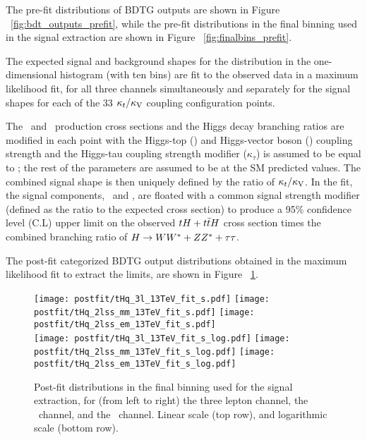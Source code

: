 The pre-fit distributions of BDTG outputs are shown in Figure ~\ref{fig:bdt_outputs_prefit}, while the pre-fit distributions in the final binning used in the signal extraction are shown in Figure ~\ref{fig:finalbins_prefit}.

The expected signal and background shapes for the distribution in the one-dimensional histogram (with ten bins) are fit to the observed data in a maximum likelihood fit, for all three channels simultaneously and separately for the signal shapes for each of the 33 $\kappa_t/\kappa_\text{V}$ coupling configuration points.

The \tH\ and \ttH\ production cross sections and the Higgs decay branching ratios are modified in each point with the Higgs-top (\Ct) and Higgs-vector boson (\CV) coupling strength and the Higgs-tau coupling strength modifier ($\kappa_\tau$) is assumed to be equal to \Ct; %
the rest of the parameters are assumed to be at the SM predicted values. The combined signal shape is then uniquely defined by the ratio of $\kappa_t/\kappa_\text{V}$. In the fit, the signal components, \tH\ and \ttH, are floated with a common signal strength modifier (defined as the ratio to the expected cross section) to produce a 95\% confidence level (C.L) upper limit on the observed $tH+t\bar{t}H$ cross section times the combined branching ratio of $H\to WW^* + ZZ^* + \tau\tau$.

The post-fit categorized BDTG output distributions obtained in the maximum likelihood fit to extract the limits, are shown in Figure ~\ref{fig:postfit}.

\begin{figure} [!h]
 \centering
 \texttt{[image: postfit/tHq\_3l\_13TeV\_fit\_s.pdf]}
 \texttt{[image: postfit/tHq\_2lss\_mm\_13TeV\_fit\_s.pdf]}
 \texttt{[image: postfit/tHq\_2lss\_em\_13TeV\_fit\_s.pdf]} \\
 \texttt{[image: postfit/tHq\_3l\_13TeV\_fit\_s\_log.pdf]}
 \texttt{[image: postfit/tHq\_2lss\_mm\_13TeV\_fit\_s\_log.pdf]}
 \texttt{[image: postfit/tHq\_2lss\_em\_13TeV\_fit\_s\_log.pdf]}
\caption[Post-fit distributions in the final binning.]{Post-fit distributions in the final binning used for the signal extraction, for (from left to right) the three lepton channel, the \mumu\ channel, and the \emu\ channel. Linear scale (top row), and logarithmic scale (bottom row).}
\label{fig:postfit}
\end{figure}

